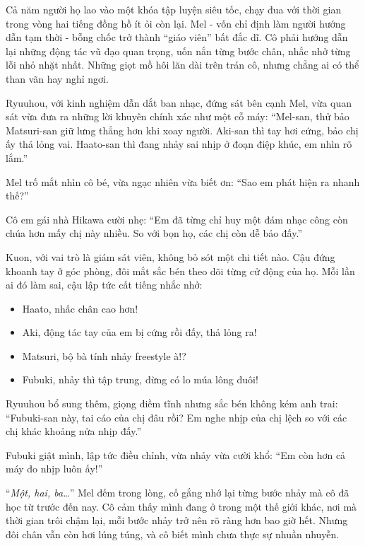 \documentclass[../main.tex]{subfiles}
\begin{document}
Cả năm người họ lao vào một khóa tập luyện siêu tốc, chạy đua với thời gian trong vòng hai tiếng đồng hồ ít ỏi còn lại. Mel - vốn chỉ định làm người hướng dẫn tạm thời - bỗng chốc trở thành ``giáo viên'' bất đắc dĩ. Cô phải hướng dẫn lại những động tác vũ đạo quan trọng, uốn nắn từng bước chân, nhắc nhở từng lỗi nhỏ nhặt nhất. Những giọt mồ hôi lăn dài trên trán cô, nhưng chẳng ai có thể than vãn hay nghỉ ngơi.

Ryuuhou, với kinh nghiệm dẫn dắt ban nhạc, đứng sát bên cạnh Mel, vừa quan sát vừa đưa ra những lời khuyên chính xác như một cỗ máy: ``Mel-san, thử bảo Matsuri-san giữ lưng thẳng hơn khi xoay người. Aki-san thì tay hơi cứng, bảo chị ấy thả lỏng vai. Haato-san thì đang nhảy sai nhịp ở đoạn điệp khúc, em nhìn rõ lắm.''

Mel trố mắt nhìn cô bé, vừa ngạc nhiên vừa biết ơn: ``Sao em phát hiện ra nhanh thế?''

Cô em gái nhà Hikawa cười nhẹ: ``Em đã từng chỉ huy một đám nhạc công còn chúa hơn mấy chị này nhiều. So với bọn họ, các chị còn dễ bảo đấy.''

Kuon, với vai trò là giám sát viên, không bỏ sót một chi tiết nào. Cậu đứng khoanh tay ở góc phòng, đôi mắt sắc bén theo dõi từng cử động của họ. Mỗi lần ai đó làm sai, cậu lập tức cất tiếng nhắc nhở:

\begin{itemize}
  \item Haato, nhấc chân cao hơn!
  \item Aki, động tác tay của em bị cứng rồi đấy, thả lỏng ra!
  \item Matsuri, bộ bà tính nhảy freestyle à!?
  \item Fubuki, nhảy thì tập trung, đừng có lo múa lông đuôi!
\end{itemize}

Ryuuhou bổ sung thêm, giọng điềm tĩnh nhưng sắc bén không kém anh trai: ``Fubuki-san này, tai cáo của chị đâu rồi? Em nghe nhịp của chị lệch so với các chị khác khoảng nửa nhịp đấy.''

Fubuki giật mình, lập tức điều chỉnh, vừa nhảy vừa cười khổ: ``Em còn hơn cả máy đo nhịp luôn ấy!''

``\textit{Một, hai, ba\dots}'' Mel đếm trong lòng, cố gắng nhớ lại từng bước nhảy mà cô đã học từ trước đến nay. Cô cảm thấy mình đang ở trong một thế giới khác, nơi mà thời gian trôi chậm lại, mỗi bước nhảy trở nên rõ ràng hơn bao giờ hết. Nhưng đôi chân vẫn còn hơi lúng túng, và cô biết mình chưa thực sự nhuần nhuyễn.
\end{document}
